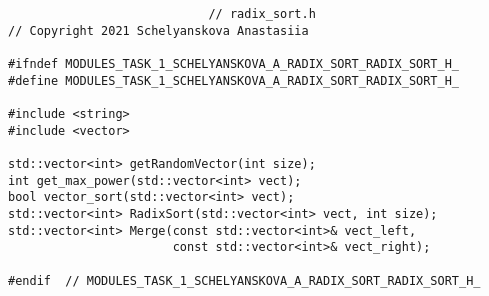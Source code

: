 \documentclass{report}
\begin{document}
\begin{lstlisting}
							// radix_sort.h
// Copyright 2021 Schelyanskova Anastasiia

#ifndef MODULES_TASK_1_SCHELYANSKOVA_A_RADIX_SORT_RADIX_SORT_H_
#define MODULES_TASK_1_SCHELYANSKOVA_A_RADIX_SORT_RADIX_SORT_H_

#include <string>
#include <vector>

std::vector<int> getRandomVector(int size);
int get_max_power(std::vector<int> vect);
bool vector_sort(std::vector<int> vect);
std::vector<int> RadixSort(std::vector<int> vect, int size);
std::vector<int> Merge(const std::vector<int>& vect_left,
                       const std::vector<int>& vect_right);

#endif  // MODULES_TASK_1_SCHELYANSKOVA_A_RADIX_SORT_RADIX_SORT_H_

\end{lstlisting}
\end{document}
